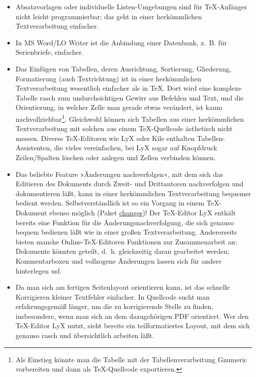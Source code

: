 \documentclass[11pt,a4paper,ngerman,DIV=8]{scrartcl}
\begin{document}
\begin{itemize}
  \item Absatzvorlagen oder individuelle Listen-Umgebungen sind für \TeX{}-Anfänger nicht leicht programmierbar; das geht in einer herkömmlichen Textverarbeitung einfacher.
  \item In MS Word/LO Writer ist die Anbindung einer Datenbank, z.~B. für Serienbriefe, einfacher.
  \item Das Einfügen von Tabellen, deren Ausrichtung, Sortierung, Gliederung, Formatierung (auch Textrichtung) ist in einer herkömmlichen Textverarbeitung wesentlich einfacher als in \TeX{}. Dort wird eine komplexe Tabelle rasch zum undurchsichtigen Gewirr aus Befehlen und Text, und die Orientierung, in welcher Zelle man gerade etwas verändert, ist kaum nachvollziehbar\footnote{Als Einstieg könnte man die Tabelle mit der Tabellenverarbeitung Gnumeric vorbereiten und dann als \TeX{}-Quellcode exportieren.}. Gleichwohl können sich Tabellen aus einer herkömmlichen Textverarbeitung mit solchen aus einem \TeX{}-Quellcode ästhetisch nicht messen. Diverse \TeX{}-Editoren wie LyX oder Kile enthalten Tabellen-Assistenten, die vieles vereinfachen, bei LyX sogar auf Knopfdruck Zeilen/Spalten löschen oder anlegen und Zellen verbinden können.
  \item Das beliebte Feature »Änderungen nachverfolgen«, mit dem sich das Editieren des Dokuments durch Zweit- und Drittautoren nachverfolgen und dokumentieren läßt, kann in einer herkömmlichen Textverarbeitung bequemer bedient werden. Selbstverständlich ist so ein Vorgang in einem \TeX{}-Dokument ebenso möglich (Paket \href{https://www.teuderun.de/latex/n\%C3\%BCtzliche-kniffe/\%C3\%A4nderungsverfolgung/}{changes})! Der \TeX{}-Editor LyX enthält bereits eine Funktion für die Änderungsnachverfolgung, die sich genauso bequem bedienen läßt wie in einer großen Textverarbeitung. Andererseits bieten manche Online-\TeX{}-Editoren Funktionen zur Zusammenarbeit an: Dokumente könnten geteilt, d.~h. gleichzeitig daran gearbeitet werden; Kommentarboxen und vollzogene Änderungen lassen sich für andere hinterlegen usf.
  \item Da man sich am fertigen Seitenlayout orientieren kann, ist das schnelle Korrigieren kleiner Textfehler einfacher. In Quellcode sucht man erfahrungsgemäß länger, um die zu korrigierende Stelle zu finden, insbesondere, wenn man sich an dem dazugehörigen PDF orientiert. Wer den \TeX{}-Editor LyX nutzt, sieht bereits ein teilformatiertes Layout, mit dem sich genauso rasch und übersichtlich arbeiten läßt.
\end{itemize}
\end{document}
